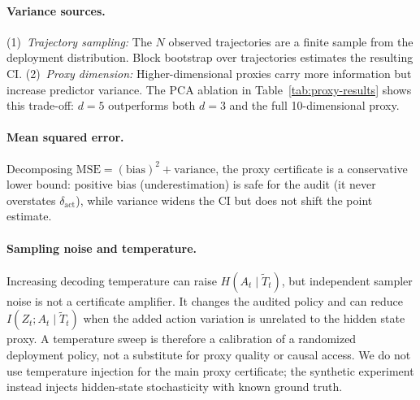   \paragraph{Variance sources.}
  (1)~\emph{Trajectory sampling:} The $N$ observed trajectories are a finite
  sample from the deployment distribution. Block bootstrap over trajectories
  estimates the resulting CI.
  (2)~\emph{Proxy dimension:} Higher-dimensional proxies carry more information
  but increase predictor variance. The PCA ablation in
  Table~\ref{tab:proxy-results} shows this trade-off: $d{=}5$ outperforms both
  $d{=}3$ and the full 10-dimensional proxy.

  \paragraph{Mean squared error.}
  Decomposing $\text{MSE} = (\text{bias})^2 + \text{variance}$, the proxy
  certificate is a conservative lower bound: positive bias (underestimation) is
  safe for the audit (it never overstates $\delta_\text{act}$), while variance
  widens the CI but does not shift the point estimate.

  \paragraph{Sampling noise and temperature.}
  Increasing decoding temperature can raise $H(A_t \mid \tilde T_t)$, but
  independent sampler noise is not a certificate amplifier. It changes the
  audited policy and can reduce $I(Z_t; A_t \mid \tilde T_t)$ when the added
  action variation is unrelated to the hidden state proxy. A temperature sweep
  is therefore a calibration of a randomized deployment policy, not a substitute
   for proxy quality or causal access. We do not use temperature injection for
  the main proxy certificate; the synthetic experiment instead injects
  hidden-state stochasticity with known ground truth.
